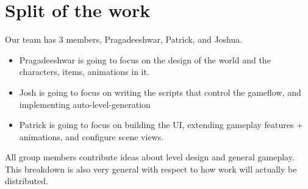 \documentclass[11pt]{article}
\begin{document}
\section{Split of the work}
Our team has 3 members, Pragadeeshwar, Patrick, and Joshua.
\begin{itemize}
    \item Pragadeeshwar is going to focus on the design of the world and the characters, items, animations in it. 
    \item Josh is going to focus on writing the scripts that control the gameflow, and implementing auto-level-generation
    \item Patrick is going to focus on building the UI, extending gameplay features + animations, and configure scene views.  
\end{itemize}

All group members contribute ideas about level design and general gameplay. This breakdown is also very general with respect to how work will actually be distributed.
\end{document}
